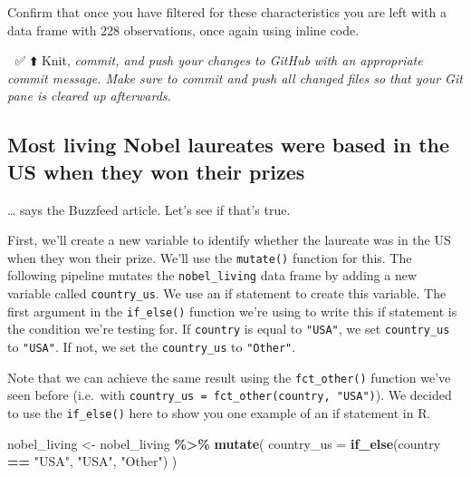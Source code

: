 \documentclass[
]{article}
\newenvironment{Shaded}{\begin{snugshade}}{\end{snugshade}}
\newcommand{\AttributeTok}[1]{\textcolor[rgb]{0.13,0.29,0.53}{#1}}
\newcommand{\FunctionTok}[1]{\textcolor[rgb]{0.13,0.29,0.53}{\textbf{#1}}}
\newcommand{\NormalTok}[1]{#1}
\newcommand{\OtherTok}[1]{\textcolor[rgb]{0.56,0.35,0.01}{#1}}
\newcommand{\SpecialCharTok}[1]{\textcolor[rgb]{0.81,0.36,0.00}{\textbf{#1}}}
\newcommand{\StringTok}[1]{\textcolor[rgb]{0.31,0.60,0.02}{#1}}
\begin{document}
Confirm that once you have filtered for these characteristics you are
left with a data frame with 228 observations, once again using inline
code.

🧶 ✅ ⬆️ Knit, \emph{commit, and push your changes to GitHub with an
appropriate commit message. Make sure to commit and push all changed
files so that your Git pane is cleared up afterwards.}

\subsection{Most living Nobel laureates were based in the US when they
won their
prizes}\label{most-living-nobel-laureates-were-based-in-the-us-when-they-won-their-prizes}

\ldots{} says the Buzzfeed article. Let's see if that's true.

First, we'll create a new variable to identify whether the laureate was
in the US when they won their prize. We'll use the \texttt{mutate()}
function for this. The following pipeline mutates the
\texttt{nobel\_living} data frame by adding a new variable called
\texttt{country\_us}. We use an if statement to create this variable.
The first argument in the \texttt{if\_else()} function we're using to
write this if statement is the condition we're testing for. If
\texttt{country} is equal to \texttt{"USA"}, we set \texttt{country\_us}
to \texttt{"USA"}. If not, we set the \texttt{country\_us} to
\texttt{"Other"}.

\begin{marginfigure}
Note that we can achieve the same result using the \texttt{fct\_other()}
function we've seen before (i.e.~with
\texttt{country\_us\ =\ fct\_other(country,\ "USA")}). We decided to use
the \texttt{if\_else()} here to show you one example of an if statement
in R.
\end{marginfigure}

\begin{Shaded}
\begin{Highlighting}[]
\NormalTok{nobel\_living }\OtherTok{\textless{}{-}}\NormalTok{ nobel\_living }\SpecialCharTok{\%\textgreater{}\%}
  \FunctionTok{mutate}\NormalTok{(}
    \AttributeTok{country\_us =} \FunctionTok{if\_else}\NormalTok{(country }\SpecialCharTok{==} \StringTok{"USA"}\NormalTok{, }\StringTok{"USA"}\NormalTok{, }\StringTok{"Other"}\NormalTok{)}
\NormalTok{  )}
\end{Highlighting}
\end{Shaded}
\end{document}
